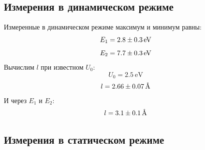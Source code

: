\documentclass[12pt]{article}%
\begin{document}
\subsection{Измерения в динамическом режиме}%
\label{subsec:}%
Измеренные в динамическом режиме максимум и минимум равны:%
\[%
E_1= \SI[uncertainty-mode=separate,round-mode=uncertainty,round-precision=1,separate-uncertainty-units=single]{2.8 +- 0.28284271247461906}{\electronvolt}%
\]%
\[%
E_2= \SI[uncertainty-mode=separate,round-mode=uncertainty,round-precision=1,separate-uncertainty-units=single]{7.7 +- 0.28284271247461906}{\electronvolt}%
\]%
Вычислим $l$ при известном $U_0$:%
\[%
U_0= \SI[round-mode=places,round-precision=1]{2.5}{\electronvolt}%
\]%
\[%
l= \SI[uncertainty-mode=separate,round-mode=uncertainty,round-precision=1,separate-uncertainty-units=single]{2.663626822427687 +- 0.07107428636562241}{\angstrom}%
\]%
И через $E_1$ и $E_2$:%
\[%
l= \SI[uncertainty-mode=separate,round-mode=uncertainty,round-precision=1,separate-uncertainty-units=single]{3.0971930840899606 +- 0.12641604424856984}{\angstrom}%
\]

%
\subsection{Измерения в статическом режиме}%
\label{subsec:}%
\end{document}
